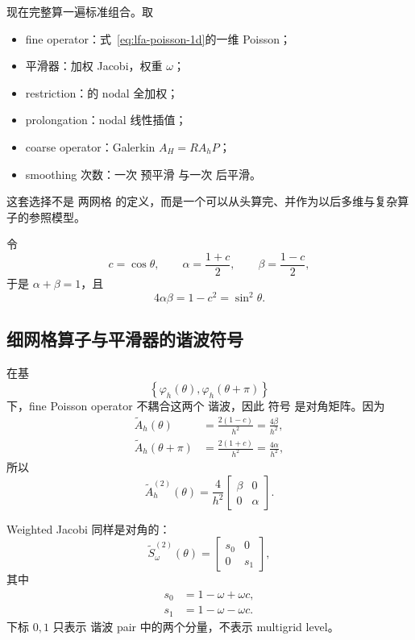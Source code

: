 现在完整算一遍标准组合。取
\begin{itemize}
\item fine operator：式~\eqref{eq:lfa-poisson-1d}的一维 Poisson；
\item 平滑器：加权 Jacobi，权重 $\omega$；
\item restriction：的 nodal 全加权；
\item prolongation：nodal 线性插值；
\item coarse operator：Galerkin $A_H=RA_hP$；
\item smoothing 次数：一次 预平滑 与一次 后平滑。
\end{itemize}
这套选择不是 两网格 的定义，而是一个可以从头算完、并作为以后多维与复杂算子的参照模型。

令
\begin{equation}
c=\cos\theta,
\qquad
\alpha=\frac{1+c}{2},
\qquad
\beta=\frac{1-c}{2},
\label{eq:lfa-alpha-beta}
\end{equation}
于是 $\alpha+\beta=1$，且
\begin{equation}
4\alpha\beta=1-c^2=\sin^2\theta.
\end{equation}

\subsection{细网格算子与平滑器的谐波符号}

在基
\begin{equation}
\left\{
\varphi_h(\theta),
\varphi_h(\theta+\pi)
\right\}
\end{equation}
下，fine Poisson operator 不耦合这两个 谐波，因此 符号 是对角矩阵。因为
\begin{align}
\widetilde A_h(\theta)
&=\frac{2(1-c)}{h^2}=\frac{4\beta}{h^2},\\
\widetilde A_h(\theta+\pi)
&=\frac{2(1+c)}{h^2}=\frac{4\alpha}{h^2},
\end{align}
所以
\begin{equation}
\widetilde A_h^{(2)}(\theta)
=\frac4{h^2}
\begin{bmatrix}
\beta&0\\
0&\alpha
\end{bmatrix}.
\label{eq:lfa-pair-fine-operator}
\end{equation}

Weighted Jacobi 同样是对角的：
\begin{equation}
\widetilde S_\omega^{(2)}(\theta)
=\begin{bmatrix}
s_0&0\\
0&s_1
\end{bmatrix},
\label{eq:lfa-pair-smoother}
\end{equation}
其中
\begin{align}
s_0
&=1-\omega+\omega c,\\
s_1
&=1-\omega-\omega c.
\label{eq:lfa-pair-smoothing-factors}
\end{align}
下标 $0,1$ 只表示 谐波 pair 中的两个分量，不表示 multigrid level。

